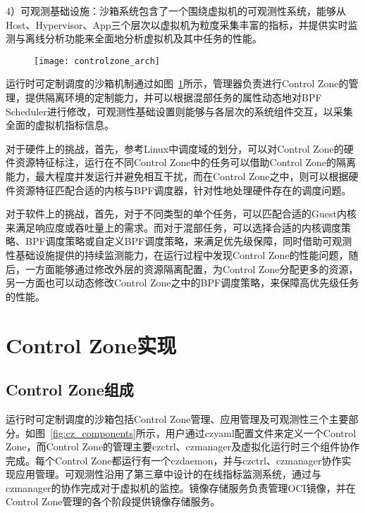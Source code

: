 4）可观测基础设施：沙箱系统包含了一个围绕虚拟机的可观测性系统，能够从Host、Hypervisor、App三个层次以虚拟机为粒度采集丰富的指标，并提供实时监测与离线分析功能来全面地分析虚拟机及其中任务的性能。

\begin{figure}[!htbp]
    \centering
    \texttt{[image: controlzone\_arch]}
    \label{fig:controlzone_arch}
\end{figure}
 
运行时可定制调度的沙箱机制通过如图~\ref{fig:controlzone_arch}所示，管理器负责进行Control Zone的管理，提供隔离环境的定制能力，并可以根据混部任务的属性动态地对BPF Scheduler进行修改，可观测性基础设置则能够与各层次的系统组件交互，以采集全面的虚拟机指标信息。

对于硬件上的挑战，首先，参考Linux中调度域的划分，可以对Control Zone的硬件资源特征标注，运行在不同Control Zone中的任务可以借助Control Zone的隔离能力，最大程度并发运行并避免相互干扰，而在Control Zone之中，则可以根据硬件资源特征匹配合适的内核与BPF调度器，针对性地处理硬件存在的调度问题。

对于软件上的挑战，首先，对于不同类型的单个任务，可以匹配合适的Guest内核来满足响应度或吞吐量上的需求。而对于混部任务，可以选择合适的内核调度策略、BPF调度策略或自定义BPF调度策略，来满足优先级保障，同时借助可观测性基础设施提供的持续监测能力，在运行过程中发现Control Zone的性能问题，随后，一方面能够通过修改外层的资源隔离配置，为Control Zone分配更多的资源，另一方面也可以动态修改Control Zone之中的BPF调度策略，来保障高优先级任务的性能。

\section{Control Zone实现}

\subsection{Control Zone组成}


运行时可定制调度的沙箱包括Control Zone管理、应用管理及可观测性三个主要部分。如图~\ref{fig:cz_components}所示，用户通过czyaml配置文件来定义一个Control Zone，而Control Zone的管理主要czctrl、czmanager及虚拟化运行时三个组件协作完成。每个Control Zone都运行有一个czdaemon，并与czctrl、czmanager协作实现应用管理。可观测性沿用了第三章中设计的在线指标监测系统，通过与czmanager的协作完成对于虚拟机的监控。镜像存储服务负责管理OCI镜像，并在Control Zone管理的各个阶段提供镜像存储服务。

